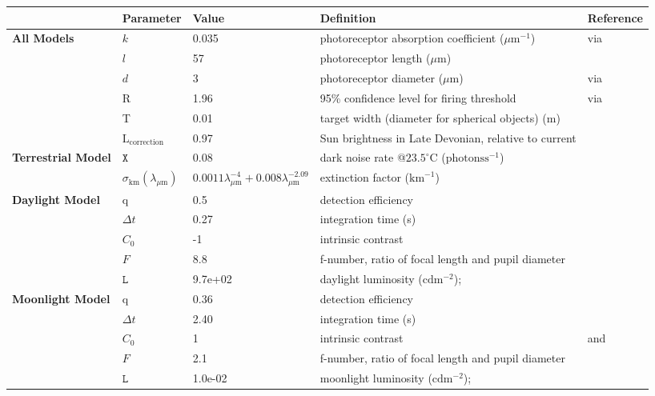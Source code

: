 \begin{tabular}{|L{3.5cm}|L{2cm}|L{2cm}|L{4.5cm}|L{4.5cm}|}
\hline
\textbf{ }&\textbf{Parameter}&\textbf{Value}&\textbf{Definition}&\textbf{Reference}\\\hline
\textbf{All Models}&$k$&0.035&photoreceptor absorption coefficient ($\mu \text{m}^{-1}$)&\cite{Part90a} via \cite{Warr98a}\\\hline
 &$l$&57&photoreceptor length ($\mu \text{m}$)&\cite{Nils14a}\\\hline
 &$d$&3&photoreceptor diameter ($\mu \text{m}$)&\cite{Land12a} via \cite{Nils14a}\\\hline
 &R&1.96&95\% confidence level for firing threshold&\cite{Land81a} via \cite{Nils14a}\\\hline
 &T&0.01&target width (diameter for spherical objects) (m)& \\\hline
 &$\text{L}_{\text{correction}}$&0.97&Sun brightness in Late Devonian, relative to current&\cite{Bahc01a}\\\hline
\textbf{Terrestrial Model}&$\mathtt{X}$&0.08&dark noise rate @$23.5^{\circ} \text{C}$ ($\text{photons} \text{s}^{-1}$)&\cite{Aho93a}\\\hline
 &$\sigma_{\text{km}} (\lambda_{\mu \text{m}})$&$0.0011 \lambda_{\mu \text{m}}^{-4} + 0.008 \lambda_{\mu \text{m}}^{-2.09}$&extinction factor ($\text{km}^{-1}$)&\cite{Midd52a}\\\hline
\textbf{Daylight Model}&q&0.5&detection efficiency&\cite{Pirh07a}\\\hline
 &$\Delta t$&0.27&integration time (s)&\cite{Donn95a}\\\hline
 &$C_{0}$&-1&intrinsic contrast&\cite{Blac46a}\\\hline
 &$F$&8.8&f-number, ratio of focal length and pupil diameter&\cite{Mill79a}\\\hline
 &$\mathtt{L}$&9.7e+02&daylight luminosity ($\text{cd} \text{m}^{-2}$);&\cite{Midd52a}\\\hline
\textbf{Moonlight Model}&q&0.36&detection efficiency&\cite{Nils14a}\\\hline
 &$\Delta t$&2.40&integration time (s)&\cite{Donn95a}\\\hline
 &$C_{0}$&1&intrinsic contrast&\cite{Hest68a} and \cite{Blac46a}\\\hline
 &$F$&2.1&f-number, ratio of focal length and pupil diameter&\cite{Mill79a}\\\hline
 &$\mathtt{L}$&1.0e-02&moonlight luminosity ($\text{cd} \text{m}^{-2}$);&\cite{Midd52a}\\\hline

\end{tabular}
